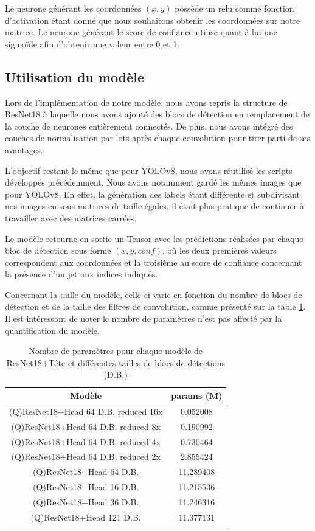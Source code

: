 Le neurone générant les coordonnées $(x, y)$ possède un \acrshort{relu} comme fonction d'activation étant donné que nous souhaitons obtenir les coordonnées sur notre matrice. Le neurone générant le score de confiance utilise quant à lui une sigmoïde afin d'obtenir une valeur entre 0 et 1.

\subsection{Utilisation du modèle}

Lors de l'implémentation de notre modèle, nous avons repris la structure de ResNet18 à laquelle nous avons ajouté des blocs de détection en remplacement de la couche de neurones entièrement connectés. De plus, nous avons intégré des couches de normalisation par lots après chaque convolution pour tirer parti de ses avantages.

L'objectif restant le même que pour YOLOv8, nous avons réutilisé les scripts développés précédemment. Nous avons notamment gardé les mêmes images que pour YOLOv8. En effet, la génération des labels étant différente et subdivisant nos images en sous-matrices de taille égales, il était plus pratique de continuer à travailler avec des matrices carrées.

Le modèle retourne en sortie un Tensor avec les prédictions réalisées par chaque bloc de détection sous forme $(x, y, conf)$, où les deux premières valeurs correspondent aux coordonnées et la troisième au score de confiance concernant la présence d'un jet aux indices indiqués.

Concernant la taille du modèle, celle-ci varie en fonction du nombre de blocs de détection et de la taille des filtres de convolution, comme présenté sur la table \ref{tab:nb_params_resnet18+head}. Il est intéressant de noter le nombre de paramètres n'est pas affecté par la quantification du modèle.

\begin{table}[!ht]
    \caption{Nombre de paramètres pour chaque modèle de ResNet18+Tête et différentes tailles de blocs de détections (D.B.)}
    \label{tab:nb_params_resnet18+head}
    \centering
    \begin{tabular}{ |c||c|  }
        \hline
        \rowcolor{gray!50}
        Modèle & params (M)\\
        \hline
        (Q)ResNet18+Head 64 D.B. reduced 16x & 0.052008\\
        (Q)ResNet18+Head 64 D.B. reduced 8x & 0.190992\\
        (Q)ResNet18+Head 64 D.B. reduced 4x & 0.730464\\
        (Q)ResNet18+Head 64 D.B. reduced 2x & 2.855424\\
        (Q)ResNet18+Head 64 D.B. & 11.289408\\
        (Q)ResNet18+Head 16 D.B. & 11.215536\\
        (Q)ResNet18+Head 36 D.B. & 11.246316\\
        (Q)ResNet18+Head 121 D.B. & 11.377131\\
        \hline
    \end{tabular}
\end{table}

